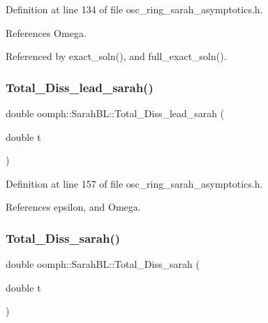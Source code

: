 Definition at line 134 of file osc\+\_\+ring\+\_\+sarah\+\_\+asymptotics.\+h.



References Omega.



Referenced by exact\+\_\+soln(), and full\+\_\+exact\+\_\+soln().

\mbox{\label{namespaceoomph_1_1SarahBL_a8dccddb7ea423d14b6fa8dc9bdb9eca7}} 
\subsubsection{\texorpdfstring{Total\+\_\+\+Diss\+\_\+lead\+\_\+sarah()}{Total\_Diss\_lead\_sarah()}}
{\footnotesize\ttfamily double oomph\+::\+Sarah\+B\+L\+::\+Total\+\_\+\+Diss\+\_\+lead\+\_\+sarah (\begin{DoxyParamCaption}\item[{double}]{t }\end{DoxyParamCaption})}



Definition at line 157 of file osc\+\_\+ring\+\_\+sarah\+\_\+asymptotics.\+h.



References epsilon, and Omega.

\mbox{\label{namespaceoomph_1_1SarahBL_abcbefc8bfea90a749dcb6961d9d5c0a0}} 
\subsubsection{\texorpdfstring{Total\+\_\+\+Diss\+\_\+sarah()}{Total\_Diss\_sarah()}}
{\footnotesize\ttfamily double oomph\+::\+Sarah\+B\+L\+::\+Total\+\_\+\+Diss\+\_\+sarah (\begin{DoxyParamCaption}\item[{double}]{t }\end{DoxyParamCaption})}



